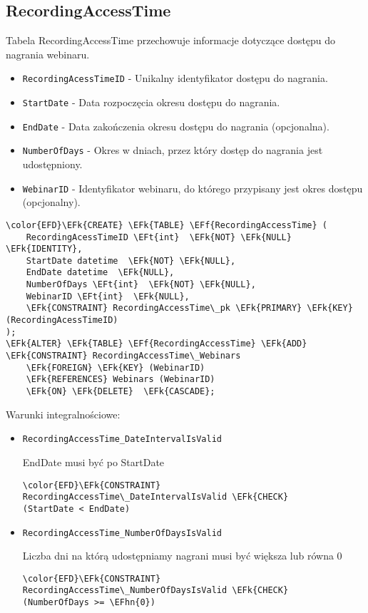 \documentclass[11pt]{article}
\newcommand{\EFk}[1]{\textcolor{EFk}{\textbf{#1}}} %
\newcommand{\EFf}[1]{\textcolor{EFf}{#1}} %
\newcommand{\EFt}[1]{\textcolor{EFt}{\textbf{#1}}} %
\newcommand{\EFhn}[1]{\textcolor{EFhn}{#1}} %
\begin{document}
\subsection{RecordingAccessTime}
\label{sec:orga1e4e34}
Tabela RecordingAccessTime przechowuje informacje dotyczące dostępu do nagrania webinaru.
\begin{itemize}
\item \texttt{RecordingAcessTimeID} - Unikalny identyfikator dostępu do nagrania.
\item \texttt{StartDate} - Data rozpoczęcia okresu dostępu do nagrania.
\item \texttt{EndDate} - Data zakończenia okresu dostępu do nagrania (opcjonalna).
\item \texttt{NumberOfDays} - Okres w dniach, przez który dostęp do nagrania jest udostępniony.
\item \texttt{WebinarID} - Identyfikator webinaru, do którego przypisany jest okres dostępu (opcjonalny).
\end{itemize}
\begin{Code}
\begin{Verbatim}
\color{EFD}\EFk{CREATE} \EFk{TABLE} \EFf{RecordingAccessTime} (
    RecordingAcessTimeID \EFt{int}  \EFk{NOT} \EFk{NULL} \EFk{IDENTITY},
    StartDate datetime  \EFk{NOT} \EFk{NULL},
    EndDate datetime  \EFk{NULL},
    NumberOfDays \EFt{int}  \EFk{NOT} \EFk{NULL},
    WebinarID \EFt{int}  \EFk{NULL},
    \EFk{CONSTRAINT} RecordingAccessTime\_pk \EFk{PRIMARY} \EFk{KEY}  (RecordingAcessTimeID)
);
\EFk{ALTER} \EFk{TABLE} \EFf{RecordingAccessTime} \EFk{ADD} \EFk{CONSTRAINT} RecordingAccessTime\_Webinars
    \EFk{FOREIGN} \EFk{KEY} (WebinarID)
    \EFk{REFERENCES} Webinars (WebinarID)
    \EFk{ON} \EFk{DELETE}  \EFk{CASCADE};
\end{Verbatim}
\end{Code}
Warunki integralnościowe:


\begin{itemize}
\item \texttt{RecordingAccessTime\_DateIntervalIsValid}

EndDate musi być po StartDate
\begin{Code}
\begin{Verbatim}
\color{EFD}\EFk{CONSTRAINT} RecordingAccessTime\_DateIntervalIsValid \EFk{CHECK}
(StartDate < EndDate)
\end{Verbatim}
\end{Code}
\item \texttt{RecordingAccessTime\_NumberOfDaysIsValid}

Liczba dni na którą udostępniamy nagrani musi być większa lub równa 0
\begin{Code}
\begin{Verbatim}
\color{EFD}\EFk{CONSTRAINT} RecordingAccessTime\_NumberOfDaysIsValid \EFk{CHECK}
(NumberOfDays >= \EFhn{0})
\end{Verbatim}
\end{Code}
\end{itemize}
\end{document}
